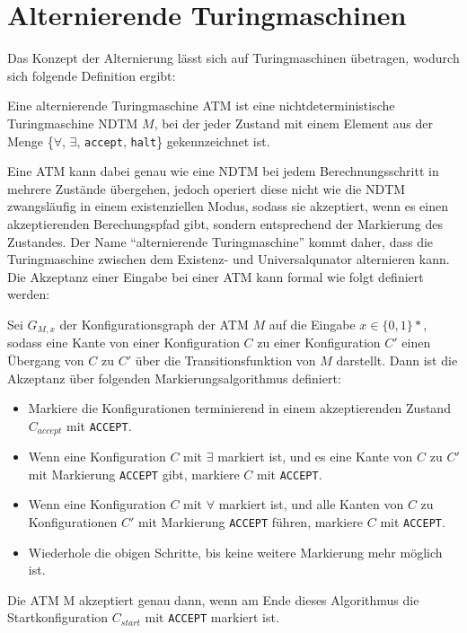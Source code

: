 \section{Alternierende Turingmaschinen} \label{section: alternierende Turingmaschine}
Das Konzept der Alternierung lässt sich auf Turingmaschinen übetragen, wodurch sich folgende Definition ergibt:
\begin{definition}\cite{pass_lecture_nodate}
    Eine alternierende Turingmaschine ATM ist eine nichtdeterministische Turingmaschine NDTM $M$, bei der jeder Zustand mit einem 
    Element aus der Menge \{$\forall$, $\exists$, \texttt{accept}, \texttt{halt}\} gekennzeichnet ist.
\end{definition}

Eine ATM kann dabei genau wie eine NDTM bei jedem Berechnungsschritt in mehrere Zustände übergehen, jedoch operiert diese nicht
wie die NDTM zwangsläufig in einem existenziellen Modus, sodass sie akzeptiert, wenn es einen akzeptierenden Berechungspfad gibt, sondern entsprechend der Markierung des Zustandes.
Der Name \enquote{alternierende Turingmaschine} kommt daher, dass die Turingmaschine zwischen dem Existenz- und Universalqunator alternieren kann.
Die Akzeptanz einer Eingabe bei einer ATM kann formal wie folgt definiert werden:
\begin{definition}\cite{arora_computational_2009}
    Sei $G_{M, x}$ der Konfigurationsgraph der ATM $M$ auf die Eingabe $x \in \{0,1\}*$, sodass eine Kante von einer Konfiguration $C$ zu 
    einer Konfiguration $C'$ einen Übergang von $C$ zu $C'$ über die Transitionsfunktion von $M$ darstellt. Dann ist die Akzeptanz über folgenden
    Markierungsalgorithmus definiert:

    \begin{itemize}
        \item Markiere die Konfigurationen terminierend in einem akzeptierenden Zustand $C_{accept}$ mit \texttt{ACCEPT}.
    \end{itemize}
    \begin{itemize}        
        \item Wenn eine Konfiguration $C$ mit $\exists$ markiert ist, und es eine Kante von $C$ zu $C'$ mit Markierung \texttt{ACCEPT} gibt, markiere $C$ mit \texttt{ACCEPT}.
        \item Wenn eine Konfiguration $C$ mit $\forall$ markiert ist, und alle Kanten von $C$ zu Konfigurationen $C'$ mit Markierung \texttt{ACCEPT} führen, markiere $C$ mit \texttt{ACCEPT}.
        \item Wiederhole die obigen Schritte, bis keine weitere Markierung mehr möglich ist.
    \end{itemize}

    Die ATM M akzeptiert genau dann, wenn am Ende dieses Algorithmus die Startkonfiguration $C_{start}$ mit \texttt{ACCEPT} markiert ist.
\end{definition}
